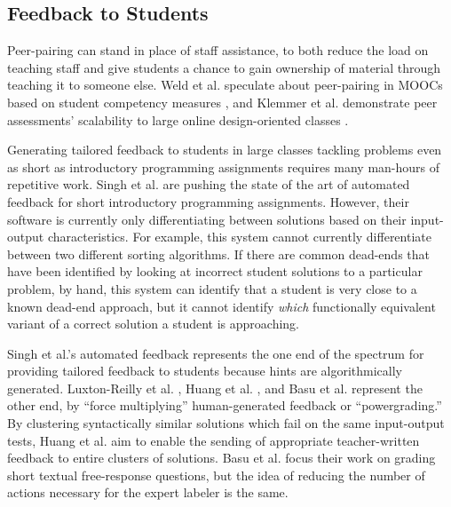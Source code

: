 \documentclass[12pt]{article}
\begin{document}
\subsection{Feedback to Students}

Peer-pairing can stand in place of staff assistance, to both reduce the load on teaching staff and give students a chance to gain ownership of material through teaching it to someone else. Weld et al. speculate about peer-pairing in MOOCs based on student competency measures \cite{WeldHcomp12}, and Klemmer et al. demonstrate peer assessments' scalability to large online design-oriented classes \cite{Klemmer}.

Generating tailored feedback to students in large classes tackling problems even as short as introductory programming assignments requires many man-hours of repetitive work. Singh et al. \cite{rishabh} are pushing the state of the art of automated feedback for short introductory programming assignments. However, their software is currently only differentiating between solutions based on their input-output characteristics. For example, this system cannot currently differentiate between two different sorting algorithms. If there are common dead-ends that have been identified by looking at incorrect student solutions to a particular problem, by hand, this system can identify that a student is very close to a known dead-end approach, but it cannot identify {\em which} functionally equivalent variant of a correct solution a student is approaching. 

Singh et al.'s automated feedback represents the one end of the spectrum for providing tailored feedback to students because hints are algorithmically generated. Luxton-Reilly et al. \cite{Luxton13}, Huang et al. \cite{MOOCshop}, and Basu et al. \cite{basupowergrading} represent the other end, by ``force multiplying'' human-generated feedback or ``powergrading.'' By clustering syntactically similar solutions which fail on the same input-output tests, Huang et al. aim to enable the sending of appropriate teacher-written feedback to entire clusters of solutions. Basu et al. \cite{basupowergrading} focus their work on grading short textual free-response questions, but the idea of reducing the number of actions necessary for the expert labeler is the same.

%
\end{document}
